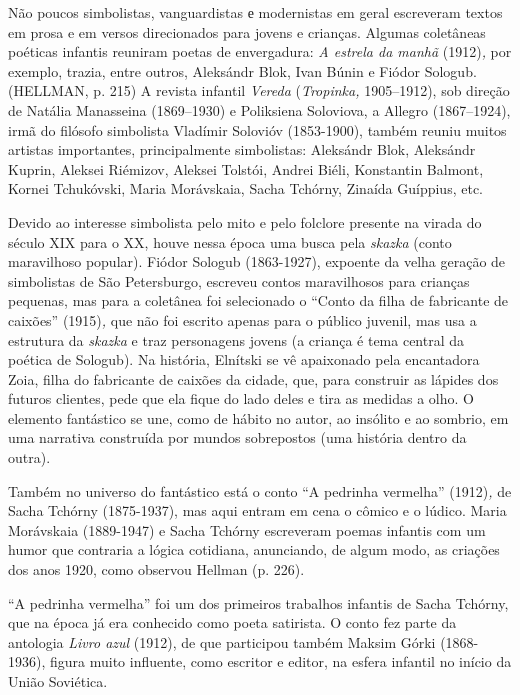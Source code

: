 Não poucos simbolistas, vanguardistas е modernistas em geral escreveram
textos em prosa e em versos direcionados para jovens e crianças. Algumas
coletâneas poéticas infantis reuniram poetas de envergadura: \emph{A
estrela da manhã} (1912)\emph{,} por exemplo, trazia, entre outros,
Aleksándr Blok, Ivan Búnin e Fiódor Sologub. (HELLMAN, p. 215) A revista
infantil \emph{Vereda} (\emph{Tropinka,} 1905--1912), sob direção de
Natália Manasseina (1869--1930) e Poliksiena Soloviova, a Allegro
(1867--1924), irmã do filósofo simbolista Vladímir Solovióv (1853-1900),
também reuniu muitos artistas importantes, principalmente simbolistas:
Aleksándr Blok, Aleksándr Kuprin, Aleksei Riémizov, Aleksei Tolstói,
Andrei Biéli, Konstantin Balmont, Kornei Tchukóvski, Maria Morávskaia,
Sacha Tchórny, Zinaída Guíppius, etc.

Devido ao interesse simbolista pelo mito e pelo folclore presente na
virada do século XIX para o XX, houve nessa época uma busca pela
\emph{skazka} (conto maravilhoso popular). Fiódor Sologub (1863-1927),
expoente da velha geração de simbolistas de São Petersburgo, escreveu
contos maravilhosos para crianças pequenas, mas para a coletânea foi
selecionado o ``Conto da filha de fabricante de caixões'' (1915)\emph{,}
que não foi escrito apenas para o público juvenil, mas usa a estrutura
da \emph{skazka} e traz personagens jovens (a criança é tema central da
poética de Sologub). Na história, Elnítski se vê apaixonado pela
encantadora Zoia, filha do fabricante de caixões da cidade, que, para
construir as lápides dos futuros clientes, pede que ela fique do lado
deles e tira as medidas a olho. O elemento fantástico se une, como de
hábito no autor, ao insólito e ao sombrio, em uma narrativa construída
por mundos sobrepostos (uma história dentro da outra).

Também no universo do fantástico está o conto ``A pedrinha vermelha''
(1912)\emph{,} de Sacha Tchórny (1875-1937), mas aqui entram em cena o
cômico e o lúdico. Maria Morávskaia (1889-1947) e Sacha Tchórny
escreveram poemas infantis com um humor que contraria a lógica
cotidiana, anunciando, de algum modo, as criações dos anos 1920, como
observou Hellman (p. 226).

``A pedrinha vermelha'' foi um dos primeiros trabalhos infantis de Sacha
Tchórny, que na época já era conhecido como poeta satirista. O conto fez
parte da antologia \emph{Livro azul} (1912), de que participou também
Maksim Górki (1868-1936), figura muito influente, como escritor e
editor, na esfera infantil no início da União Soviética.

